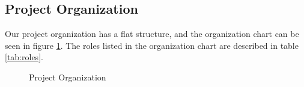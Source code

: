 \subsection{Project Organization}
Our project organization has a flat structure, and the organization chart can be seen in figure \ref{fig:orgchart}. The roles listed in the organization chart are described in table \ref{tab:roles}.

\begin{figure}[htb]
	\noindent{}
	\caption{Project Organization\label{fig:orgchart}}
\end{figure}

